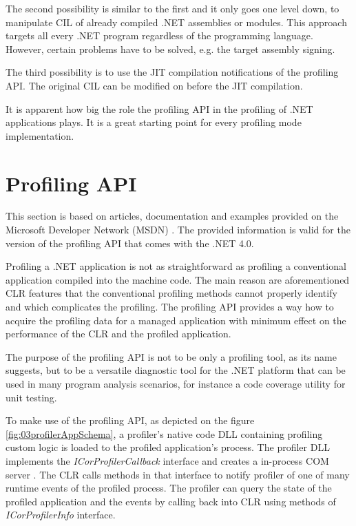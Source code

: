 The second possibility is similar to the first and it only goes one level down, to manipulate CIL of already compiled .NET assemblies or modules. This approach targets all every .NET program regardless of the programming language. However, certain problems have to be solved, e.g. the target assembly signing.

The third possibility is to use the JIT compilation notifications of the profiling API. The original CIL can be modified on before the JIT compilation.

It is apparent how big the role the profiling API in the profiling of .NET applications plays. It is a great starting point for every profiling mode implementation.

\section{Profiling API}
This section is based on articles, documentation and examples provided on the Microsoft Developer Network (MSDN) \cite{ProfMSDN}. The provided information is valid for the version of the profiling API that comes with the .NET 4.0. 

Profiling a .NET application is not as straightforward as profiling a conventional application compiled into the machine code. The main reason are aforementioned CLR features that the conventional profiling methods cannot properly identify and which complicates the profiling. The profiling API provides a way how to acquire the profiling data for a managed application with minimum effect on the performance of the CLR and the profiled application. 

The purpose of the profiling API is not to be only a profiling tool, as its name suggests, but to be a versatile diagnostic tool for the .NET platform that can be used in many program analysis scenarios, for instance a code coverage utility for unit testing.

To make use of the profiling API, as depicted on the figure \ref{fig:03profilerAppSchema}, a profiler's native code DLL containing profiling custom logic is loaded to the profiled application's process. The profiler DLL implements the \textit{ICorProfilerCallback} interface and creates a in-process COM server . The CLR calls methods in that interface to notify profiler of one of many runtime events of the profiled process. The profiler can query the state of the profiled application and the events by calling back into CLR using methods of \textit{ICorProfilerInfo} interface.

